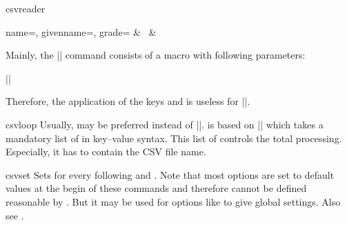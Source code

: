 \documentclass[a4paper,11pt]{ltxdoc}
\begin{document}
\begin{docCommand}{csvreader}{}
\begin{dispExample}
%
  {name=\name, givenname=\firstname, grade=\grade}{%
    \grade & \firstname~\name & \csvcoliii
  }
\end{dispExample}

Mainly, the |\csvreader| command consists of a  macro with
following parameters:\par
||\par
  Therefore, the application of the keys  and 
is useless for |\csvreader|.
\end{docCommand}


\clearpage
\begin{docCommand}{csvloop}{}
  Usually,  may be preferred instead of |\csvloop|.
   is based on |\csvloop| which takes a mandatory list of
   in key–value syntax.
  This list of  controls the total processing. Especially,
  it has to contain the CSV file name.
\begin{dispExample}
\end{dispExample}
\end{docCommand}


\begin{docCommand}[doc updated = 2021-06-25]{csvset}{}
  Sets  for every following
   and .
  Note that most options are set to default values at the begin of these
  commands and therefore cannot be defined reasonable by .
  But it may be used for options like 
  to give global settings. Also see .
\end{docCommand}
\end{document}
